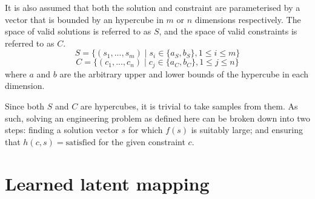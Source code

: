 \documentclass[../../main.tex]{subfiles}
\begin{document}
It is also assumed that both the solution and constraint are parameterised by a vector that is bounded by an hypercube in $m$ or $n$ dimensions respectively.
The space of valid solutions is referred to as $S$, and the space of valid constraints is referred to as $C$.
$$S = \{(s_1, ..., s_m) \; | \; s_i \in \{a_S, b_S\}, 1 \le i \le m\}$$
$$C = \{(c_1, ..., c_n) \; | \; c_j \in \{a_C, b_C\}, 1 \le j \le n\}$$
where $a$ and $b$ are the arbitrary upper and lower bounds of the hypercube in each dimension.

Since both $S$ and $C$ are hypercubes, it is trivial to take samples from them.
As such, solving an engineering problem as defined here can be broken down into two steps: finding a solution vector $s$ for which $f(s)$ is suitably large; and ensuring that $h(c, s) = \text{satisfied}$ for the given constraint $c$.

\section{Learned latent mapping}
\end{document}
